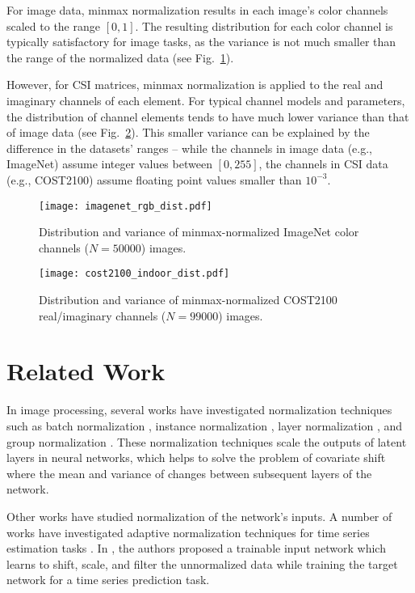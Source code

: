 For image data, minmax normalization results in each image's color channels scaled to the range $[0,1]$. The resulting distribution for each color channel is typically satisfactory for image tasks, as the variance is not much smaller than the range of the normalized data (see Fig.~\ref{fig:imagenet_dist}).

However, for CSI matrices, minmax normalization is applied to the real and imaginary channels of each element. For typical channel models and parameters, the distribution of channel elements tends to have much lower variance than that of image data (see Fig.~\ref{fig:cost_indoor_dist}). This smaller variance can be explained by the difference in the datasets' ranges -- while the channels in image data (e.g., ImageNet) assume integer values between $[0,255]$, the channels in CSI data (e.g., COST2100) assume floating point values smaller than $10^{-3}$.

\begin{figure}[htb]
	\centering
	\texttt{[image: imagenet\_rgb\_dist.pdf]}
	\medskip
	\caption{Distribution and variance of minmax-normalized ImageNet color channels ($N=50000$) images.}
	\label{fig:imagenet_dist}
\end{figure}

\begin{figure}[htb]
	\centering
	\texttt{[image: cost2100\_indoor\_dist.pdf]}
	\medskip
	\caption{Distribution and variance of minmax-normalized COST2100 real/imaginary channels ($N=99000$) images.}
	\label{fig:cost_indoor_dist}
\end{figure}

\section{Related Work}

In image processing, several works have investigated normalization techniques such as batch normalization \cite{ref:ioffe2015batch}, instance normalization \cite{ref:huang2017instance}, layer normalization \cite{ref:ba2016layer}, and group normalization \cite{ref:wu2018group}. These normalization techniques scale the outputs of latent layers in neural networks, which helps to solve the problem of covariate shift \cite{ref:ioffe2015batch} where the mean and variance of changes between subsequent layers of the network.

Other works have studied normalization of the network's inputs. A number of works have investigated adaptive normalization techniques for time series estimation tasks \cite{ref:ogasawara2010adaptive, ref:nayak2014impact, ref:shao2015self}. In \cite{ref:passalis2019dain}, the authors proposed a trainable input network which learns to shift, scale, and filter the unnormalized data while training the target network for a time series prediction task.

